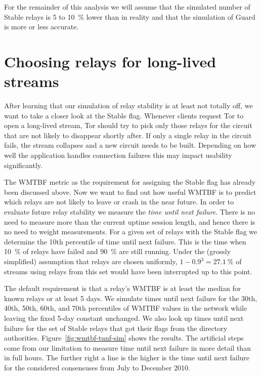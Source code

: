 \documentclass{article}
\begin{document}
For the remainder of this analysis we will assume that the simulated
number of Stable relays is 5 to 10~\% lower than in reality and that the
simulation of Guard is more or less accurate.

\section{Choosing relays for long-lived streams}
\label{sec:mtbf-sim}

After learning that our simulation of relay stability is at least not
totally off, we want to take a closer look at the Stable flag.
Whenever clients request Tor to open a long-lived stream, Tor should try
to pick only those relays for the circuit that are not likely to disappear
shortly after.
If only a single relay in the circuit fails, the stream collapses and a
new circuit needs to be built.
Depending on how well the application handles connection failures this may
impact usability significantly.

The WMTBF metric as the requirement for assigning the Stable flag has
already been discussed above.
Now we want to find out how useful WMTBF is to predict which relays are
not likely to leave or crash in the near future.
In order to evaluate future relay stability we measure the \emph{time
until next failure}.
There is no need to measure more than the current uptime session length,
and hence there is no need to weight measurements.
For a given set of relays with the Stable flag we determine the 10th
percentile of time until next failure.
This is the time when 10~\% of relays have failed and 90~\% are still
running.
Under the (grossly simplified) assumption that relays are chosen
uniformly, $1 - 0.9^3 = 27.1~\%$ of streams using relays from this set
would have been interrupted up to this point.

The default requirement is that a relay's WMTBF is at least the median for
known relays or at least 5 days.
We simulate times until next failure for the 30th, 40th, 50th, 60th, and
70th percentiles of WMTBF values in the network while leaving the fixed
5-day constant unchanged.
We also look up times until next failure for the set of Stable relays that
got their flags from the directory authorities.
Figure~\ref{fig:wmtbf-tunf-sim} shows the results.
The artificial steps come from our limitation to measure time until next
failure in more detail than in full hours.
The further right a line is the higher is the time until next failure for
the considered consensuses from July to December 2010.
\end{document}
